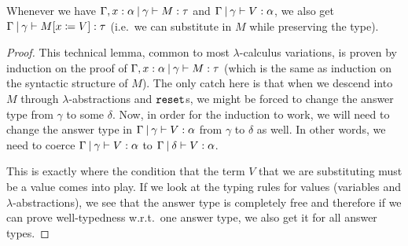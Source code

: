 \begin{lemma}
  \label{lem:subst-shift}

  Whenever we have $\Gamma, x : \alpha \mathbin{|} \gamma \vdash M : \tau$ and
  $\Gamma \mathbin{|} \gamma \vdash V : \alpha$, we also get $\Gamma \mathbin{|} \gamma
  \vdash M[x \coloneqq V] : \tau$ (i.e.\ we can substitute in $M$ while
  preserving the type).
\end{lemma}
\begin{proof}
  This technical lemma, common to most $\lambda$-calculus variations, is
  proven by induction on the proof of $\Gamma, x : \alpha \mathbin{|} \gamma
  \vdash M : \tau$ (which is the same as induction on the syntactic
  structure of $M$). The only catch here is that when we descend into $M$
  through $\lambda$-abstractions and $\mathtt{reset}$s, we might be forced to
  change the answer type from $\gamma$ to some $\delta$. Now, in order for
  the induction to work, we will need to change the answer type in $\Gamma
  \mathbin{|} \gamma \vdash V : \alpha$ from $\gamma$ to $\delta$ as well. In
  other words, we need to coerce $\Gamma \mathbin{|} \gamma \vdash V : \alpha$ to
  $\Gamma \mathbin{|} \delta \vdash V : \alpha$.

  This is exactly where the condition that the term $V$ that we are
  substituting must be a value comes into play. If we look at the typing
  rules for values (variables and $\lambda$-abstractions), we see that the
  answer type is completely free and therefore if we can prove
  well-typedness w.r.t.\ one answer type, we also get it for all answer
  types.
\end{proof}

